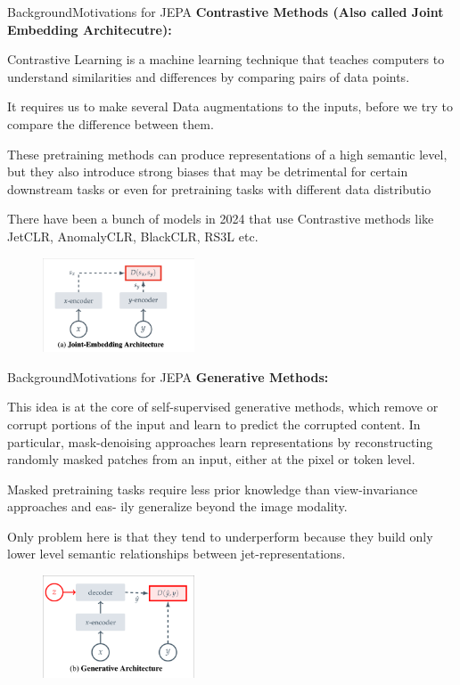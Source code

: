 \documentclass[10pt]{beamer}
\begin{document}
\begin{frame}{Background}{Motivations for JEPA}
  \textbf{Contrastive Methods (Also called Joint Embedding Architecutre):}
  \begin{footnotesize}
Contrastive Learning is a machine learning technique that teaches computers to understand similarities and
differences by comparing pairs of data points.

It requires us to make several Data augmentations to the inputs, before we try to compare the difference
between them.

These pretraining methods can produce representations of a high semantic level, but
they also introduce strong biases that may be detrimental
for certain downstream tasks or even for pretraining tasks
with different data distributio

There have been a bunch of models in 2024 that use Contrastive methods like JetCLR, AnomalyCLR,
BlackCLR, RS3L etc.
\end{footnotesize}
\begin{figure}
  \includegraphics[width=0.4\textwidth]{clr.png}
\end{figure}

\end{frame}

\begin{frame}{Background}{Motivations for JEPA}
  \textbf{Generative Methods:}
  \begin{footnotesize}
This idea is at the core of self-supervised generative methods, which remove
or corrupt portions of the input and learn to predict the corrupted content.
In particular, mask-denoising approaches learn representations by reconstructing
randomly masked patches from an input, either at the pixel or token level.

Masked pretraining tasks require less
prior knowledge than view-invariance approaches and eas-
ily generalize beyond the image modality.

Only problem here is that they tend to underperform because
they build only lower level semantic relationships between jet-representations.

\end{footnotesize}
\begin{figure}
  \includegraphics[width=0.4\textwidth]{gen.png}
\end{figure}

\end{frame}
\end{document}
